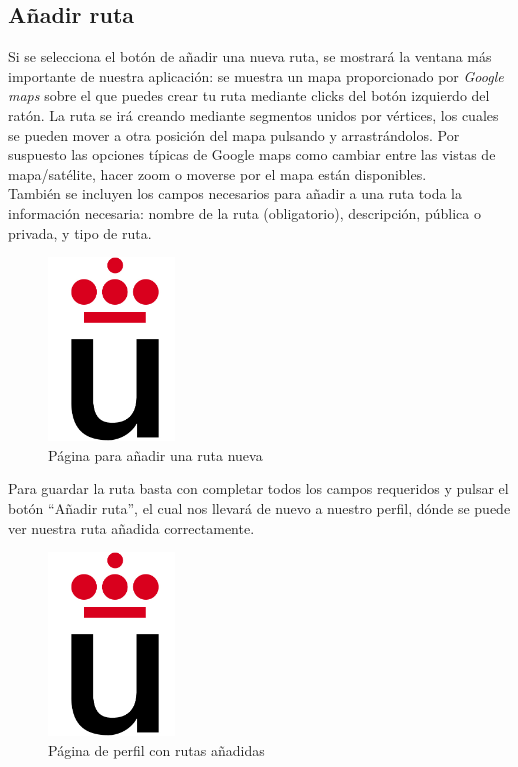 \documentclass[11pt,a4paper]{article}
\begin{document}
\subsection{Añadir ruta}
Si se selecciona el botón de añadir una nueva ruta, se mostrará la ventana más importante de nuestra aplicación: se muestra un mapa proporcionado por \textit{Google maps} sobre el que puedes crear tu ruta mediante clicks del botón izquierdo del ratón. La ruta se irá creando mediante segmentos unidos por vértices, los cuales se pueden mover a otra posición del mapa pulsando y arrastrándolos. Por suspuesto las opciones típicas de Google maps como cambiar entre las vistas de mapa/satélite, hacer zoom o moverse por el mapa están disponibles.\\
También se incluyen los campos necesarios para añadir a una ruta toda la información necesaria: nombre de la ruta (obligatorio), descripción, pública o privada, y tipo de ruta.\\
\begin{figure}[h]
\centering
  \includegraphics[width=0.3\textwidth]{./imagenes/logoURJC}
  \caption{Página para añadir una ruta nueva}
  \label{fig: Página para añadir una ruta nueva}
\end{figure}
Para guardar la ruta basta con completar todos los campos requeridos y pulsar el botón ``Añadir ruta'', el cual nos llevará de nuevo a nuestro perfil, dónde se puede ver nuestra ruta añadida correctamente.
\begin{figure}[h]
\centering
  \includegraphics[width=0.3\textwidth]{./imagenes/logoURJC}
  \caption{Página de perfil con rutas añadidas}
  \label{fig: Página de perfil con rutas añadidas}
\end{figure}
\end{document}
